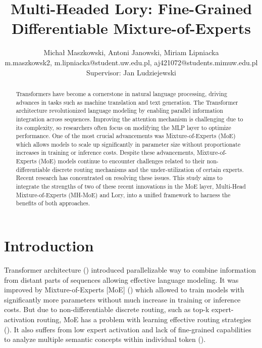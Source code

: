 \documentclass[12pt]{article}
\begin{document}
 
 
\title{Multi-Headed Lory: Fine-Grained Differentiable Mixture-of-Experts}%
\author{Michał Maszkowski, Antoni Janowski, Miriam Lipniacka\\ %
{m.maszkowsk2, m.lipniacka}@student.uw.edu.pl, aj421072@students.mimuw.edu.pl\\
Supervisor: Jan Ludziejewski}
\maketitle


\begin{center}
\begin{minipage}{0.8\textwidth}
\begin{abstract}
Transformers have become a cornerstone in natural language processing, driving advances in tasks such as machine translation and text generation. The Transformer architecture revolutionized language modeling by enabling parallel information integration across sequences. Improving the attention mechanism is challenging due to its complexity, so researchers often focus on modifying the MLP layer to optimize performance. One of the most crucial advancements was Mixture-of-Experts (MoE) which allows models to scale up significantly in parameter size without proportionate increases in training or inference costs. Despite these advancements, Mixture-of-Experts (MoE) models continue to encounter challenges related to their non-differentiable discrete routing mechanisms and the under-utilization of certain experts. Recent research has concentrated on resolving these issues. This study aims to integrate the strengths of two of these recent innovations in the MoE layer, Multi-Head Mixture-of-Experts (MH-MoE) and Lory, into a unified framework to harness the benefits of both approaches.

\end{abstract}
\end{minipage}
\end{center}

\section{Introduction}
Transformer architecture (\cite{vaswani2017attention}) introduced parallelizable way to combine information from distant parts of sequences allowing effective language modeling. It was improved by Mixture-of-Experts [MoE] (\cite{shazeer2017outrageously}) which allowed to train models with significantly more parameters without much increase in training or inference costs. But due to non-differentiable discrete routing, such as top-k expert-activation routing, MoE has a problem with learning effective routing strategies (\cite{muqeeth2023soft}). It also suffers from low expert activation and lack of fine-grained capabilities to analyze multiple semantic concepts within individual token (\cite{wu2024multihead}).
\end{document}
